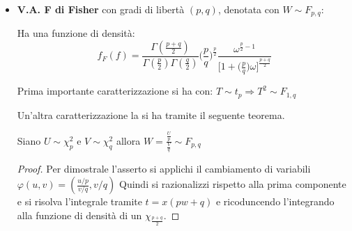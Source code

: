 \begin{itemize}
     $T\sim t_1$ è detta di Cauchy.
     
     Un importante teorema che lega distribuzione normale e  chi-quadro alla student è il seguente.
     \begin{theorem}
     Siano $U\sim N(0,1)$ e $V\sim\chi_p^2$ allora $T=\frac{U}{\sqrt{\frac{V}{p}}}\sim t_p$
     \begin{proof}
     Per dimostrale l'asserto si applichi il cambiamento di variabili \newline $\varphi(u,v)=(\frac{u}{\sqrt{\frac{v}{p}}},v)$. 
     
     Quindi si razionalizzi rispetto alla prima componente e si risolva l'integrale ricoduncendo l'integrando alla funzione di densità di una \newline $\Gamma((p+1)/2,\frac{1}{2}(1+t^2/p))$.
     \end{proof}
     \end{theorem}
     
     \vspace{10px}
     \item \textbf{V.A. F di Fisher} con gradi di libertà $(p,q)$, denotata con $W\sim F_{p,q}$:
     
     Ha una funzione di densità: \[f_F(f)=\frac{\Gamma(\frac{p+q}{2})}{\Gamma(\frac{p}{2})\Gamma(\frac{q}{2})}\bigg(\frac{p}{q}\bigg)^{\frac{p}{2}}\frac{\omega^{\frac{p}{2}-1}}{\Big[1+\big(\frac{p}{q}\big)\omega\Big]^{\frac{p+q}{2}}}\]
     
     Prima importante caratterizzazione si ha con: $T\sim t_p \Rightarrow T^2\sim F_{1,q}$
     
     Un'altra caratterizzazione la si ha tramite il seguente teorema.
     \begin{theorem}
     Siano $U\sim\chi_p^2$ e $V\sim\chi_q^2$ allora $W=\frac{\frac{U}{p}}{\frac{V}{q}}\sim F_{p,q}$
     \end{theorem}
     \begin{proof}
     Per dimostrale l'asserto si applichi il cambiamento di variabili \newline
     $\varphi(u,v)=(\frac{u/p}{v/q},v/q)$
     Quindi si razionalizzi rispetto alla prima componente e si risolva l'integrale tramite $t=x(pw+q)$ e ricoduncendo l'integrando alla funzione di densità di un $\chi_{\frac{p+q}{2}}$.
     \end{proof}
\end{itemize}


